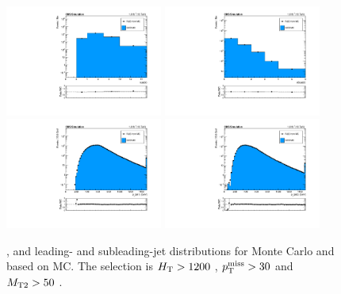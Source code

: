 \begin{figure}[htbp]
  \begin{center}
    \includegraphics[width=0.46\textwidth]{figs/qcd/rs_mc/highht_nJet30.pdf}
    \includegraphics[width=0.46\textwidth]{figs/qcd/rs_mc/highht_nBJet20.pdf} \\
    \includegraphics[width=0.46\textwidth]{figs/qcd/rs_mc/highht_J0pt.pdf}
    \includegraphics[width=0.46\textwidth]{figs/qcd/rs_mc/highht_J1pt.pdf}
    \caption{\njets, \nbtags and leading- and subleading-jet \pt distributions for Monte Carlo and \rs based on MC. The selection is $H_{\mathrm{T}} > 1200$ \GeV, $p_{\mathrm{T}}^{\mathrm{miss}} > 30$ \GeV and $M_{\mathrm{T2}} > 50$ \GeV.
            }
    \label{Fig:rs_mc_jets_highht}
  \end{center}
\end{figure}

